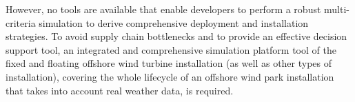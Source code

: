 However, no tools are available that enable developers to perform a robust multi-criteria simulation to derive comprehensive deployment and installation strategies. To avoid supply chain bottlenecks and to provide an effective decision support tool, an integrated and comprehensive simulation platform tool of the fixed and floating offshore wind turbine installation (as well as other types of installation), covering the whole lifecycle of an offshore wind park installation that takes into account real weather data, is required. 